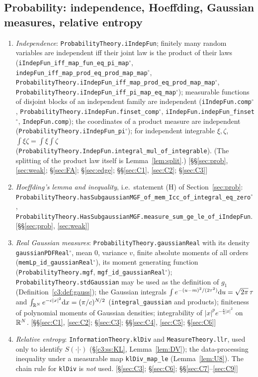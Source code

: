 \subsection{Probability: independence, Hoeffding, Gaussian measures, relative entropy}
\begin{enumerate}[leftmargin=2em,itemsep=1pt]\raggedright
\item \emph{Independence}: \texttt{ProbabilityTheory.iIndepFun}; finitely many random variables are independent iff their joint law is the product of their laws
(\texttt{iIndepFun\_iff\_map\_fun\_eq\_pi\_map}$^\circ$, \texttt{indepFun\_iff\_map\_prod\_eq\_prod\_map\_map}$^\circ$, \texttt{ProbabilityTheory.iIndepFun\_iff\_map\_prod\_eq\_prod\_map\_map}$^\circ$,
\texttt{ProbabilityTheory.iIndepFun\_iff\_pi\_map\_eq\_map}$^\circ$); measurable functions of disjoint blocks of an independent family are independent (\texttt{iIndepFun.comp}$^\circ$,
\texttt{ProbabilityTheory.iIndepFun.finset\_comp}$^\circ$, \texttt{iIndepFun.indepFun\_finset}$^\circ$, \texttt{IndepFun.comp}); the coordinates of a product measure are independent
(\texttt{ProbabilityTheory.iIndepFun\_pi}$^\circ$); for independent integrable $\xi,\zeta$, $\int\xi\zeta=\int\xi\int\zeta$ (\texttt{ProbabilityTheory.IndepFun.integral\_mul\_of\_integrable}).
(The splitting of the product law itself is Lemma~\ref{lem:split}.) \hfill[\S\S\ref{sec:prob}, \ref{sec:weak}; \S\ref{sec:FA}; \S\ref{sec:edge}; \S\S\ref{sec:C1}, \ref{sec:C2}; \S\ref{sec:C3}]
\item \emph{Hoeffding's lemma and inequality}, i.e.\ statement (H) of Section~\ref{sec:prob}: \texttt{ProbabilityTheory.hasSubgaussianMGF\_of\_mem\_Icc\_of\_integral\_eq\_zero}$^\circ$,
\texttt{ProbabilityTheory.HasSubgaussianMGF.measure\_sum\_ge\_le\_of\_iIndepFun}. \hfill[\S\S\ref{sec:prob}, \ref{sec:weak}]
\item \emph{Real Gaussian measures}: \texttt{ProbabilityTheory.gaussianReal} with its density \texttt{gaussianPDFReal}$^\circ$, mean $0$, variance $v$, finite absolute moments of all orders
(\texttt{memLp\_id\_gaussianReal}$^\circ$), its moment generating function (\texttt{ProbabilityTheory.mgf}, \texttt{mgf\_id\_gaussianReal}$^\circ$); \texttt{ProbabilityTheory.stdGaussian} may be used as the
definition of $g_1$ (Definition~\ref{c3:def:gauss}); the Gaussian integrals $\int e^{-(u-m)^2/(2\tau^2)}\mathrm{d} u=\sqrt{2\pi}\,\tau$ and $\int_{\mathbb{R}^N}e^{-c|x|^2}\mathrm{d} x=(\pi/c)^{N/2}$ (\texttt{integral\_gaussian} and products);
finiteness of polynomial moments of Gaussian densities; integrability of $|x|^pe^{-\frac\kappa4|x|^2}$ on $\mathbb{R}^N$. \hfill[\S\S\ref{sec:C1}, \ref{sec:C2}; \S\ref{sec:C3}; \S\S\ref{sec:C4}, \ref{sec:C5}; \S\ref{sec:C6}]
\item \emph{Relative entropy}: \texttt{InformationTheory.klDiv} and \texttt{MeasureTheory.llr}, used only to identify $S(\cdot|\cdot)$ (\S\ref{c3:ss:KL}, Lemma~\ref{lem:DV}); the data-processing inequality
under a measurable map \texttt{klDiv\_map\_le} (Lemma~\ref{lem:U8}). The chain rule for \texttt{klDiv} is \emph{not} used. \hfill[\S\ref{sec:C3}; \S\ref{sec:C6}; \S\S\ref{sec:C7}--\ref{sec:C9}]
\end{enumerate}

